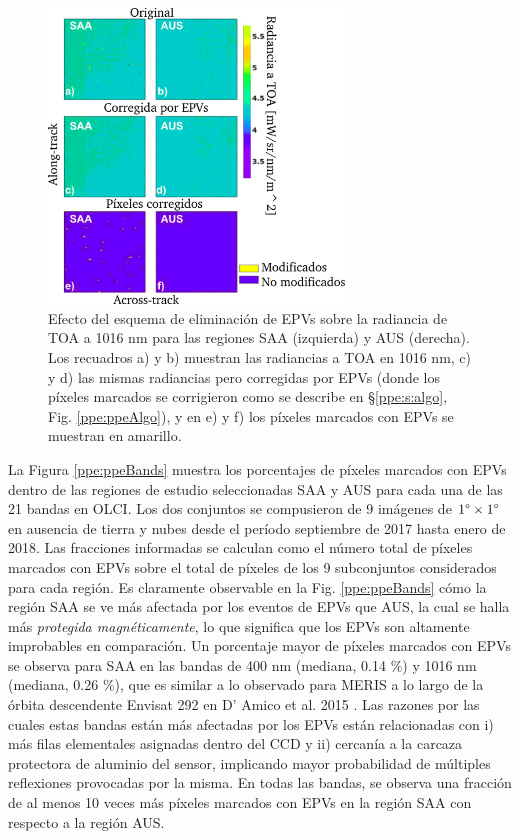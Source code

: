     \begin{figure}
    \centering
    \includegraphics[width=0.7\textwidth]{ppe/figures/ppeAUSSAA}
    \caption[Efecto del esquema de eliminación de EPVs sobre la radiancia de TOA a 1016 nm para las regiones SAA y AUS.]{Efecto del esquema de eliminación de EPVs sobre la radiancia de TOA a 1016 nm para las regiones SAA (izquierda) y AUS (derecha). Los recuadros a) y b) muestran las radiancias a TOA en 1016 nm, c) y d) las mismas radiancias pero corregidas por EPVs (donde los píxeles marcados se corrigieron como se describe en \S \ref{ppe:s:algo}, Fig. \ref{ppe:ppeAlgo}), y en e) y f) los píxeles marcados con EPVs se muestran en amarillo.}
    \label{ppe:ppeAUSSAA}
    \end{figure}
    
    La Figura \ref{ppe:ppeBands} muestra los porcentajes de píxeles marcados con EPVs dentro de las regiones de estudio seleccionadas SAA y AUS para cada una de las 21 bandas en OLCI. Los dos conjuntos se compusieron de 9 imágenes de $1 \degree \times 1 \degree$ en ausencia de tierra y nubes desde el período septiembre de 2017 hasta enero de 2018. Las fracciones informadas se calculan como el número total de píxeles marcados con EPVs sobre el total de píxeles de los 9 subconjuntos considerados para cada región. Es claramente observable en la Fig. \ref{ppe:ppeBands} cómo la región SAA se ve más afectada por los eventos de EPVs que AUS, la cual se halla más \textit{protegida magnéticamente}, lo que significa que los EPVs son altamente improbables en comparación. Un porcentaje mayor de píxeles marcados con EPVs se observa para SAA en las bandas de 400 nm (mediana, 0.14 \%) y 1016 nm (mediana, 0.26 \%), que es similar a lo observado para MERIS a lo largo de la órbita descendente Envisat 292 en D' Amico et al. 2015 \cite{damico2015}. Las razones por las cuales estas bandas están más afectadas por los EPVs están relacionadas con i) más filas elementales asignadas dentro del CCD y ii) cercanía a la carcaza protectora de aluminio del sensor, implicando mayor probabilidad de múltiples reflexiones provocadas por la misma. En todas las bandas, se observa una fracción de al menos 10 veces más píxeles marcados con EPVs en la región SAA con respecto a la región AUS.
    
